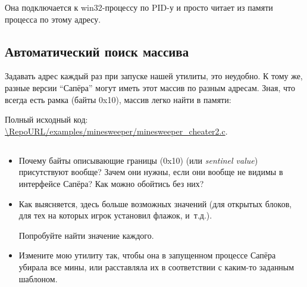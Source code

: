 Она подключается к win32-процессу по \ac{PID}-у и просто читает из памяти процесса по этому адресу.

\subsection{Автоматический поиск массива}

Задавать адрес каждый раз при запуске нашей утилиты, это неудобно.
К тому же, разные версии ``Сапёра'' могут иметь этот массив по разным адресам.
Зная, что всегда есть рамка (байты 0x10), массив легко найти в памяти:



Полный исходный код: \url{\RepoURL/examples/minesweeper/minesweeper_cheater2.c}.

\subsection{\Exercises}

\begin{itemize}

\item
Почему байты описывающие границы (0x10) (или \emph{sentinel value}) присутствуют вообще?
Зачем они нужны, если они вообще не видимы в интерфейсе Сапёра?
Как можно обойтись без них?

\item
Как выясняется, здесь больше возможных значений (для открытых блоков, для тех на которых игрок установил
флажок, и~т.д.).
	
Попробуйте найти значение каждого.

\item Измените мою утилиту так, чтобы она в запущенном процессе Сапёра убирала все мины, 
или расставляла их в соответствии с каким-то заданным шаблоном.

\end{itemize}
